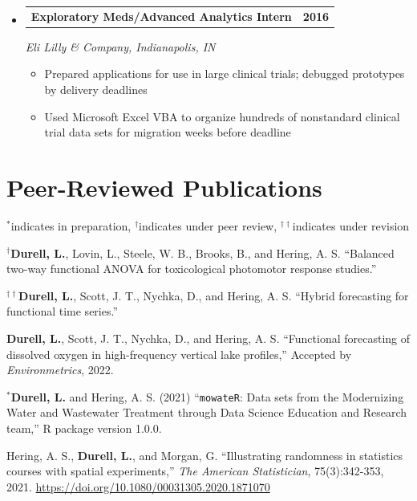\documentclass{article}
\begin{document}
\begin{itemize}[leftmargin=*]
	\item %
	\begin{tabular*}{0.97\textwidth}{l@{\extracolsep{\fill}}r}
	\textbf{Exploratory Meds/Advanced Analytics Intern} & \textbf{2016}  \\
	\end{tabular*}
	\textit{Eli Lilly \& Company, Indianapolis, IN} 
	\vspace{-7px}
	\begin{itemize}
		\item Prepared applications for use in large clinical trials; debugged prototypes by delivery deadlines \vspace{-4px}
		\item Used Microsoft Excel VBA to organize hundreds of nonstandard clinical trial data sets for migration weeks before deadline \vspace{-4px}
	\end{itemize}
\end{itemize}

%
\section{Peer-Reviewed Publications}
$^{*}$indicates in preparation, $^\dagger$indicates under peer review, $^{\dagger \dagger}$indicates under revision
\begin{etaremune}
	\item $^{\dagger}$\textbf{Durell, L.}, Lovin, L.,  Steele, W. B., Brooks, B., and Hering, A. S. “Balanced two-way functional ANOVA for toxicological photomotor response studies.” \vspace{-4px}
	\item $^{\dagger \dagger}$\textbf{Durell, L.}, Scott, J. T., Nychka, D., and Hering, A. S. “Hybrid forecasting for functional time series.”  \vspace{-4px}
	\item \textbf{Durell, L.}, Scott, J. T., Nychka, D., and Hering, A. S. “Functional forecasting of dissolved oxygen in high-frequency vertical lake profiles,” Accepted by \textit{Environmetrics}, 2022. \vspace{-4px}
	\item $^*$\textbf{Durell, L.} and Hering, A. S. (2021) “\texttt{mowateR}: Data sets from the Modernizing Water and Wastewater Treatment through Data Science Education and Research team,” R package version 1.0.0. \vspace{-4px}
	\item Hering, A. S., \textbf{Durell, L.}, and Morgan, G.  “Illustrating randomness in statistics courses with spatial experiments,” \textit{The American Statistician}, 75(3):342-353, 2021. \href{https://doi.org/10.1080/00031305.2020.1871070}{https://doi.org/10.1080/00031305.2020.1871070} \vspace{-4px}
\end{etaremune}
\end{document}
